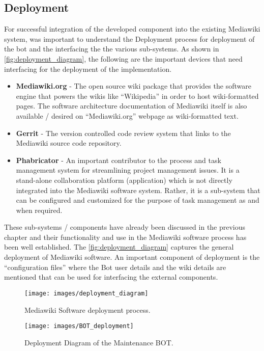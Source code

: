 \subsection{Deployment}
For successful integration of the developed component into the existing Mediawiki system, was important to understand the Deployment process for deployment of the bot and the interfacing the the various sub-systems. As shown in \autoref{fig:deployment_diagram}, the following are the important devices that need interfacing for the deployment of the implementation.  
\begin{itemize}
\item \textbf{Mediawiki.org} \cite{mediawiki} - The open source wiki package that provides the software engine that powers the wikis like \enquote{Wikipedia} in order to host wiki-formatted pages. The software architecture documentation of Mediawiki itself is also available / desired on \enquote{Mediawiki.org} webpage as wiki-formatted text.
\item \textbf{Gerrit} \cite{gerrit} - The version controlled code review system that links to the Mediawiki source code repository.
\item \textbf{Phabricator} \cite{wm-phab} - An important contributor to the process and task management system for streamlining project management issues. It is a stand-alone collaboration platform (application) which is not directly integrated into the Mediawiki software system. Rather, it is a sub-system that can be configured and customized for the purpose of task management as and when required.
\end{itemize}

These sub-systems / components have already been discussed in the previous chapter and their functionality and use in the Mediawiki software process has been well established. The \autoref{fig:deployment_diagram} captures the general deployment of Mediawiki software. An important component of deployment is the \enquote{configuration files} where the Bot user details and the wiki details are mentioned that can be used for interfacing the external components.
\begin{figure}[H]
  \centering
  \texttt{[image: images/deployment\_diagram]}
  \caption[Mediawiki Software deployment process]{Mediawiki Software deployment process.}\label{fig:deployment_diagram}
\end{figure} 


\begin{sidewaysfigure}[ht]
  \centering
  \texttt{[image: images/BOT\_deployment]}
  \caption[Deployment Diagram of the Maintenance BOT]{Deployment Diagram of the Maintenance BOT.}\label{fig:BOT_deployment}
\end{sidewaysfigure}

